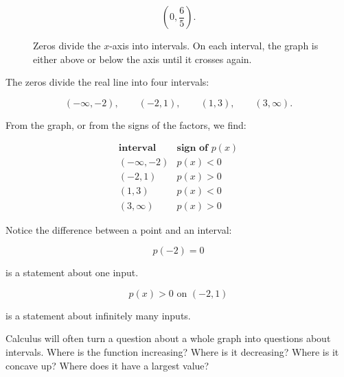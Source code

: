 \[
\left(0,\frac65\right).
\]

\begin{figure}[h]
\centering
{}
\caption{Zeros divide the \(x\)-axis into intervals. On each interval, the graph is either above or below the axis until it crosses again.}
\label{fig:cubic-sign-intervals}
\end{figure}

The zeros divide the real line into four intervals:

\[
(-\infty,-2),\qquad (-2,1),\qquad (1,3),\qquad (3,\infty).
\]

From the graph, or from the signs of the factors, we find:

\[
\begin{array}{c|c}
\textbf{interval} & \textbf{sign of }p(x) \\ \hline
(-\infty,-2) & p(x)<0 \\
(-2,1) & p(x)>0 \\
(1,3) & p(x)<0 \\
(3,\infty) & p(x)>0
\end{array}
\]

Notice the difference between a point and an interval:

\[
p(-2)=0
\]

is a statement about one input.

\[
p(x)>0 \text{ on }(-2,1)
\]

is a statement about infinitely many inputs.

Calculus will often turn a question about a whole graph into questions about intervals. Where is the function increasing? Where is it decreasing? Where is it concave up? Where does it have a largest value?

